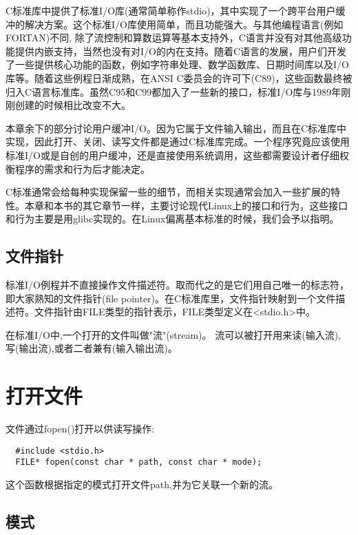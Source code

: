 C标准库中提供了标准I/O库(通常简单称作stdio)，其中实现了一个跨平台用户缓冲的解决方案。这个标准I/O库使用简单，而且功能强大。与其他编程语言(例如FORTAN)不同, 除了流控制和算数运算等基本支持外，C语言并没有对其他高级功能提供内嵌支持，当然也没有对I/O的内在支持。随着C语言的发展，用户们开发了一些提供核心功能的函数，例如字符串处理、数学函数库、日期时间库以及I/O库等。随着这些例程日渐成熟，在ANSI C委员会的许可下(C89)，这些函数最终被归入C语言标准库。虽然C95和C99都加入了一些新的接口，标准I/O库与1989年刚刚创建的时候相比改变不大。

本章余下的部分讨论用户缓冲I/O。因为它属于文件输入输出，而且在C标准库中实现，因此打开、关闭、读写文件都是通过C标准库完成。一个程序究竟应该使用标准I/O或是自创的用户缓冲，还是直接使用系统调用，这些都需要设计者仔细权衡程序的需求和行为后才能决定。

C标准通常会给每种实现保留一些的细节，而相关实现通常会加入一些扩展的特性。本章和本书的其它章节一样，主要讨论现代Linux上的接口和行为，这些接口和行为主要是用glibc实现的。在Linux偏离基本标准的时候，我们会予以指明。

\subsection{文件指针}

标准I/O例程并不直接操作文件描述符。取而代之的是它们用自己唯一的标志符，即大家熟知的文件指针(file pointer)。在C标准库里，文件指针映射到一个文件描述符。文件指针由FILE类型的指针表示，FILE类型定义在<stdio.h>中。

在标准I/O中,一个打开的文件叫做"流"(stream)。 流可以被打开用来读(输入流), 写(输出流),或者二者兼有(输入输出流)。 

\section{打开文件}

文件通过fopen()打开以供读写操作:
\begin{lstlisting}
  #include <stdio.h>
  FILE* fopen(const char * path, const char * mode);
\end{lstlisting}

这个函数根据指定的模式打开文件path,并为它关联一个新的流。

\subsection{模式}

